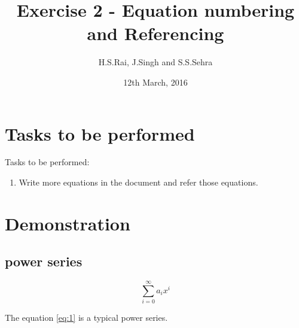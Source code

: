 \documentclass{article}
\title{Exercise 2 - Equation numbering and Referencing}
\author{H.S.Rai, J.Singh and S.S.Sehra}
\date{12th March, 2016}
\begin{document}
	\maketitle
		\section*{Tasks to be performed}
	Tasks to be performed:
	\begin{enumerate}
		\item Write more equations in the document and refer those equations.
	\end{enumerate}
\section*{Demonstration}

 
\subsection*{power series} 
 
\begin{equation} \label{eq:1}
\sum_{i=0}^{\infty} a_i x^i
\end{equation}
 
The equation \ref{eq:1} is a typical power series.
\end{document}

